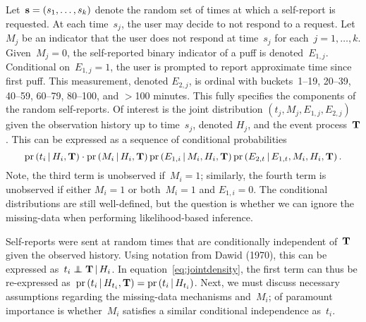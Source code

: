 \documentclass[11pt]{amsart}
\def\pr{\mathop{\text{pr}}\nolimits}
\def\pr{\mathop{\text{pr}}\nolimits}
\def\indep{\mathrel{\rlap{$\perp$}\kern1.6pt\mathord{\perp}}}
\def\given{\, | \,}
\def\bfs{{\bf s}}
\def\bfT{{\bf T}}
\begin{document}
Let~$\bfs = (s_{1}, \ldots, s_{k})$ denote the random set of times at
which a self-report is requested.
At each time~$s_j$, the user may decide to not respond to a request.
Let~$M_{j}$ be an indicator that the user does not respond at
time~$s_j$ for each~$j=1,\ldots,k$.
Given~$M_{j} = 0$, the self-reported binary indicator of a puff is
denoted~$E_{1,j}$.  Conditional on~$E_{1,j} = 1$, the user is prompted
to report approximate time since first puff. This measurement, denoted
$E_{2, j}$, is ordinal with buckets~1--19, 20--39, 40--59, 60--79,
80--100, and $>$100 minutes.  This fully specifies the components of
the random self-reports. Of interest is the joint distribution $(t_j,
M_{j}, E_{1, j}, E_{2, j})$ given the observation history up to
time~$s_j$, denoted $H_{j}$, and the event process~$\bfT$.  This can
be expressed as a sequence of conditional probabilities
\begin{equation}
  \label{eq:jointdensity}
  \pr \left( t_i \given H_{i}, \bfT \right) \cdot \pr \left( M_{i}
    \given H_{i}, \bfT \right) \pr \left( E_{1,i} \given M_{i}, H_{i},
  \bfT \right) \pr \left(E_{2,t} \given E_{1,t}, M_{i}, H_{i}, \bfT \right).
\end{equation}
Note, the third term is unobserved if~$M_{i} = 1$; similarly, the
fourth term is unobserved if either $M_{i}=1$ or both~$M_{i}=1$
and $E_{1,i} = 0$.  The conditional distributions are still
well-defined, but the question is whether we can ignore the
missing-data when performing likelihood-based inference.

Self-reports were sent at random times that are conditionally
independent of~$\bfT$ given the observed history. Using notation from
Dawid (1970), this can be expressed as~$t_i \indep \bfT \given
H_{i}$.  In equation~\eqref{eq:jointdensity}, the first term can thus
be re-expressed as~$\pr \left( t_i \given H_{t_i}, \bfT \right) = \pr
\left( t_i \given H_{t_i} \right)$.
Next, we must discuss necessary assumptions regarding the missing-data
mechanisms and~$M_{i}$; of paramount importance is whether~$M_{i}$
satisfies a similar conditional independence as~$t_i$.
\end{document}
